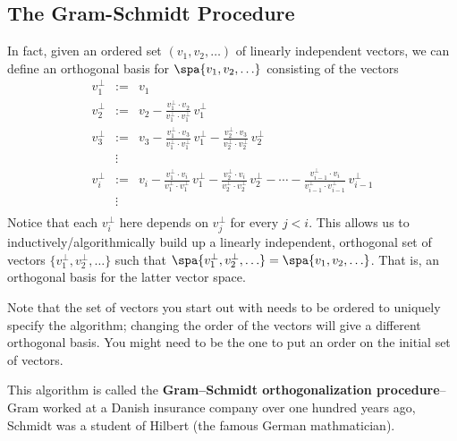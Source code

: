 \subsection{The Gram-Schmidt Procedure}
In fact, given an ordered set $(v_1, v_2, \ldots )$ of linearly independent vectors, we can define an orthogonal basis for $\spa \{v_1,v_2, \ldots \}$ consisting of the  vectors
\begin{eqnarray*}
v_1^\perp&:=&v_1 \\
v_2^\perp &:=& v_2 - \frac{v_1^\perp\cdot v_2}{v_1^\perp\cdot v_1^\perp}\,v_1^\perp \\
v_3^\perp &:=& v_3 - \frac{v_1^\perp\cdot v_3}{v_1^\perp\cdot v_1^\perp}\,v_1^\perp - \frac{v_2^\perp\cdot v_3}{v_2^\perp\cdot v_2^\perp}\,v_2^\perp\\
&\vdots& \\
v_i^\perp%
 &:=& v_i - \frac{v_1^\perp\cdot v_i}{v_1^\perp\cdot v_1^\perp}\,v_1^\perp   
 - \frac{v_2^\perp\cdot v_i}{v_2^\perp\cdot v_2^\perp}\,v_2^\perp -\cdots
 - \frac{v_{i-1}^\perp\cdot v_i}{v_{i-1}^\perp\cdot v_{i-1}^\perp}\,v_{i-1}^\perp\\
&\vdots& \\
\end{eqnarray*}
Notice that each $v_i^\perp$ here depends on  $v_j^\perp$ for every $j<i$.  This allows us to inductively/algorithmically build up a linearly independent, orthogonal set of vectors 
$\{v_1^\perp,v_2^\perp, \ldots \}$ 
such that 
$\spa \{v_1^\perp,v_2^\perp, \ldots \}=\spa \{v_1, v_2, \ldots \}$. 
That is, an orthogonal basis for the latter vector space. 

Note that the set of vectors you start out with needs to be ordered to uniquely specify the algorithm; changing the order of the vectors will give a different orthogonal basis. You might need to be the one to put an order on the initial set of vectors.

This algorithm is called the {\bfseries Gram--Schmidt orthogonalization procedure}\label{GramSchmidt}--Gram worked at a Danish insurance company over one hundred years ago, Schmidt was a student of Hilbert (the famous German mathmatician).


